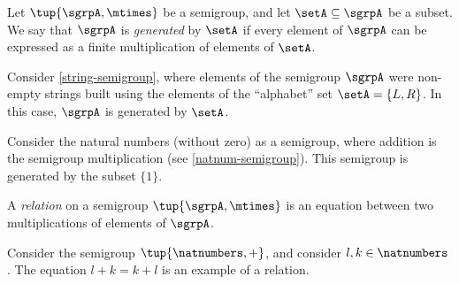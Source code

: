 \begin{definition}
Let $\tup{\sgrpA, \mtimes}$ be a semigroup, and let $\setA \subseteq \sgrpA$ be a subset. We say that $\sgrpA$ is \emph{generated} by $\setA$ if every element of $\sgrpA$ can be expressed as a finite multiplication of elements of $\setA$.
\end{definition}

\begin{example}
Consider \cref{string-semigroup}, where elements of the semigroup $\sgrpA$ were non-empty strings built using the elements of the ``alphabet'' set $\setA = \{ L, R \}$. In this case, $\sgrpA$ is generated by $\setA$.
\end{example}


\begin{example}
Consider the natural numbers (without zero) as a semigroup, where addition is the semigroup multiplication (see \cref{natnum-semigroup}). This semigroup is generated by the subset $\{1 \}$.
\end{example}

\begin{definition}
A \emph{relation} on a semigroup $\tup{\sgrpA, \mtimes}$ is an equation between two multiplications of elements of $\sgrpA$.
\end{definition}

\begin{example}
Consider the semigroup $\tup{\natnumbers, +}$, and consider $l, k \in \natnumbers$. The equation $l + k = k + l$ is an example of  a relation. 
\end{example}





\


